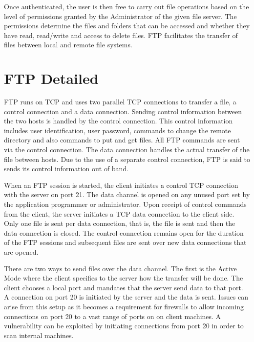 Once authenticated, the user is then free to carry out file operations based on the level of permissions granted by the Administrator of the given file server. The permissions determine the files and folders that can be accessed and whether they have read, read/write and access to delete files. FTP facilitates the transfer of files between local and remote file systems.\newpage

\section{FTP Detailed}
FTP runs on TCP and uses two parallel TCP connections to transfer a file, a control connection and a data connection. Sending control information between the two hosts is handled by the control connection. This control information includes user identification, user password, commands to change the remote directory and also commands to put and get files. All FTP commands are sent via the control connection. The data connection handles the actual transfer of the file between hosts. Due to the use of a separate control connection, FTP is said to sends its control information out of band. \par

When an FTP session is started, the client initiates a control TCP connection with the server on port 21. The data channel is opened on any unused port set by the application programmer or administrator. Upon receipt of control commands from the client, the server initiates a TCP data connection to the client side. Only one file is sent per data connection, that is, the file is sent and then the data connection is closed. The control connection remains open for the duration of the FTP sessions and subsequent files are sent over new data connections that are opened.\par

There are two ways to send files over the data channel. The first is the Active Mode where the client specifies to the server how the transfer will be done. The client chooses a local port
and mandates that the server send data to that port. A connection on port 20 is initiated by the server and the data is sent. Issues can arise from this setup as it becomes a requirement
for firewalls to allow incoming connections on port 20 to a vast range of ports on on client machines. A vulnerability can be exploited by initiating connections from port 20 in order to
scan internal machines. \par

